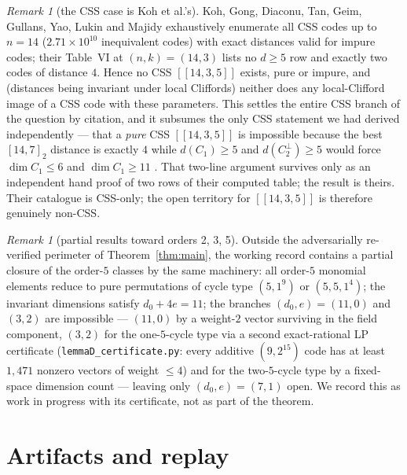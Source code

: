 \documentclass[11pt]{amsart}
\newcommand{\code}[3]{[[#1,#2,#3]]}
\theoremstyle{plain}
\theoremstyle{definition}
\theoremstyle{remark}
\newtheorem{remark}[theorem]{Remark}
\begin{document}
\begin{remark}[the CSS case is Koh et al.'s]\label{rem:css}
Koh, Gong, Diaconu, Tan, Geim, Gullans, Yao, Lukin and Majidy
\cite{Koh26} exhaustively enumerate all CSS codes up to $n=14$
($2.71\times10^{10}$ inequivalent codes) with exact distances valid for
impure codes; their Table~VI at $(n,k)=(14,3)$ lists no $d\ge5$ row and
exactly two codes of distance $4$. Hence no CSS $\code{14}{3}{5}$ exists,
pure or impure, and (distances being invariant under local Cliffords)
neither does any local-Clifford image of a CSS code with these
parameters. This settles the entire CSS branch of the question by
citation, and it subsumes the only CSS statement we had derived
independently --- that a \emph{pure} CSS $\code{14}{3}{5}$ is impossible
because the best $[14,7]_{2}$ distance is exactly $4$ while
$d(C_{1})\ge5$ and $d(C_{2}^{\perp})\ge5$ would force
$\dim C_{1}\le6$ and $\dim C_{1}\ge11$ \cite{Grassl}. That two-line
argument survives only as an independent hand proof of two rows of their
computed table; the result is theirs. Their catalogue is CSS-only; the
open territory for $\code{14}{3}{5}$ is
therefore genuinely non-CSS.
\end{remark}

\begin{remark}[partial results toward orders 2, 3, 5]\label{rem:order5}
Outside the adversarially re-verified perimeter of
Theorem~\ref{thm:main}, the working record contains a partial closure of
the order-$5$ classes by the same machinery: all order-$5$ monomial
elements reduce to pure permutations of cycle type $(5,1^{9})$ or
$(5,5,1^{4})$; the invariant dimensions satisfy $d_{0}+4e=11$; the
branches $(d_{0},e)=(11,0)$ and $(3,2)$ are impossible --- $(11,0)$ by a
weight-$2$ vector surviving in the field component, $(3,2)$ for the
one-$5$-cycle type via a second exact-rational LP certificate
(\texttt{lemmaD\_certificate.py}: every additive $(9,2^{15})$ code has at
least $1{,}471$ nonzero vectors of weight $\le4$) and for the
two-$5$-cycle type by a fixed-space dimension count --- leaving only
$(d_{0},e)=(7,1)$ open. We record this as work in progress with its
certificate, not as part of the theorem.
\end{remark}

\section{Artifacts and replay}\label{sec:artifacts}
\end{document}
